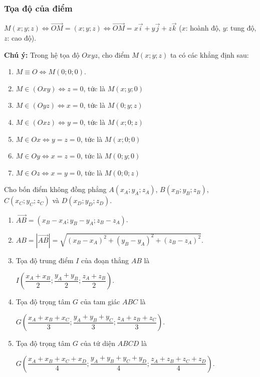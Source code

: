 \begin{tomtat}
	\subsubsection{Tọa độ của điểm}
	\begin{dn}
		$M(x; y; z )\Leftrightarrow \vec{OM} = (x; y; z )\Leftrightarrow \vec{OM}= x\vec{i}+y\vec{j}+z\vec{k}$ ($x$: hoành độ, $y$: tung độ, $z$: cao độ).
	\end{dn}
	\textbf{Chú ý:} Trong hệ tọa độ $Oxyz$, cho điểm $M(x;y;z )$ ta có các khẳng định sau:
	\begin{enumerate}
		\item $M\equiv O\Leftrightarrow M(0;0;0 )$.
		\item $M\in (Oxy )\Leftrightarrow z=0$, tức là $M(x;y;0 )$
		\item $M\in (Oyz )\Leftrightarrow x=0$, tức là $M(0;y;z )$
		\item $M\in (Oxz )\Leftrightarrow y=0$, tức là $M(x;0;z )$
		\item $M\in Ox\Leftrightarrow y=z=0$, tức là $M(x;0;0 )$
		\item $M\in Oy\Leftrightarrow x=z=0$, tức là $M(0;y;0 )$
		\item $M\in Oz\Leftrightarrow x=y=0$, tức là $M(0;0;z )$
	\end{enumerate}
	\begin{tc}
		Cho bốn điểm không đồng phẳng
		$A(x_A;y_A;z_A )$, $B(x_B;y_B;z_B )$, $C(x_C;y_C;z_C )$ và $D(x_D;y_D;z_D )$.
		
		\begin{enumerate}
			\item $\vec{AB}=(x_B-x_A;y_B-y_A;z_B-z_A )$.
			\item $AB=\left| \vec{AB} \right|=\sqrt{(x_B-x_A)^2+(y_B-y_A )^2+(z_B-z_A )^2}$.
			\item  Tọa độ trung điểm $I$ của đoạn thẳng $AB$ là
			\begin{center}
				$I\left(\dfrac{x_A+x_B}{2};\dfrac{y_A+y_B}{2};\dfrac{z_A+z_B}{2} \right)$.
			\end{center}
			\item Tọa độ trọng tâm $G$ của tam giác $ABC$ là
			\begin{center}
				$G\left(\dfrac{x_A+x_B+x_C}{3};\dfrac{y_A+y_B+y_C}{3};\dfrac{z_A+z_B+z_C}{3} \right)$.
			\end{center}
			\item Tọa độ trọng tâm $G$ của tứ diện $ABCD$ là
			\begin{center}
				$G\left(\dfrac{x_A+x_B+x_C+x_D}{4};\dfrac{y_A+y_B+y_C+y_D}{4};\dfrac{z_A+z_B+z_C+z_D}{4} \right)$.
			\end{center}
		\end{enumerate}
	\end{tc}

\end{tomtat}
